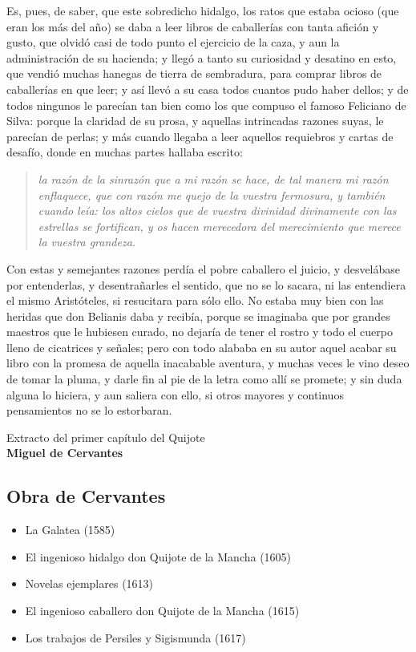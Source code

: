 \documentclass[a4paper, 12pt, twoside]{article} %
\begin{document}
Es, pues, de saber, que este sobredicho hidalgo, los ratos que estaba ocioso (que eran los más del año) se daba a leer libros de caballerías con tanta afición y gusto, que olvidó casi de todo punto el ejercicio de la caza, y aun la administración de su hacienda; y llegó a tanto su curiosidad y desatino en esto, que vendió muchas hanegas de tierra de sembradura, para comprar libros de caballerías en que leer; y así llevó a su casa todos cuantos pudo haber dellos; y de todos ningunos le parecían tan bien como los que compuso el famoso Feliciano de Silva: porque la claridad de su prosa, y aquellas intrincadas razones suyas, le parecían de perlas; y más cuando llegaba a leer aquellos requiebros y cartas de desafío, donde en muchas partes hallaba escrito: 
\begin{quote}
  \itshape
la razón de la sinrazón que a mi razón se hace, de tal manera mi razón enflaquece, que con razón me quejo de la vuestra fermosura, y también cuando leía: los altos cielos que de vuestra divinidad divinamente con las estrellas se fortifican, y os hacen merecedora del merecimiento que merece la vuestra grandeza. 
\end{quote}
Con estas y semejantes razones perdía el pobre caballero el juicio, y desvelábase por entenderlas, y desentrañarles el sentido, que no se lo sacara, ni las entendiera el mismo Aristóteles, si resucitara para sólo ello. No estaba muy bien con las heridas que don Belianis daba y recibía, porque se imaginaba que por grandes maestros que le hubiesen curado, no dejaría de tener el rostro y todo el cuerpo lleno de cicatrices y señales; pero con todo alababa en su autor aquel acabar su libro con la promesa de aquella inacabable aventura, y muchas veces le vino deseo de tomar la pluma, y darle fin al pie de la letra como allí se promete; y sin duda alguna lo hiciera, y aun saliera con ello, si otros mayores y continuos pensamientos no se lo estorbaran.

\begin{flushright}
  Extracto del primer capítulo del Quijote~\cite{cervantesQuijote}\\
\textbf{Miguel de Cervantes}
\end{flushright}


\subsection{Obra de Cervantes}

\begin{itemize}
  \item La Galatea (1585)
  \item El ingenioso hidalgo don Quijote de la Mancha (1605)
  \item Novelas ejemplares (1613)
  \item El ingenioso caballero don Quijote de la Mancha (1615)
  \item Los trabajos de Persiles y Sigismunda (1617)
\end{itemize}
\end{document}
